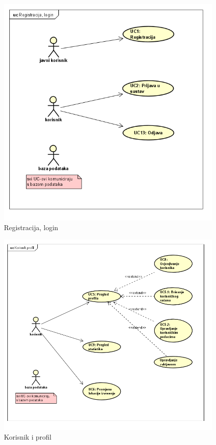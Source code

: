 				
					\begin{figure}[H]
					\includegraphics[scale=0.8]{slike/reg-log.png} %
					\centering
					\caption{Registracija, login}
				\end{figure}
				
				
					\begin{figure}[H]
					\includegraphics[scale=0.8]{slike/korisnik-profil.png} %
					\centering
					\caption{Korisnik i profil}
				\end{figure}
				
